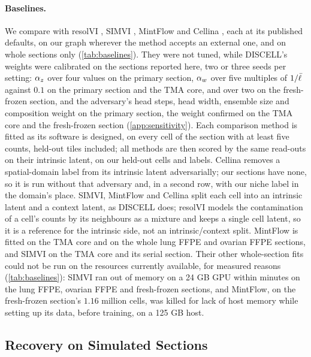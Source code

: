 \paragraph{Baselines.}
We compare with resolVI \citep{ergen2025}, SIMVI \citep{dong2025simvi}, MintFlow \citep{akbarnejad2025mintflow} and Cellina \citep{moeed2026cellina}, each at its published defaults, on our graph wherever the method accepts an external one, and on whole sections only (\cref{tab:baselines}). They were not tuned, while DISCELL's weights were calibrated on the sections reported here, two or three seeds per setting: $\alpha_z$ over four values on the primary section, $\alpha_w$ over five multiples of $1/\bar{\ell}$ against $0.1$ on the primary section and the TMA core, and over two on the fresh-frozen section, and the adversary's head steps, head width, ensemble size and composition weight on the primary section, the weight confirmed on the TMA core and the fresh-frozen section (\cref{app:sensitivity}). Each comparison method is fitted as its software is designed, on every cell of the section with at least five counts, held-out tiles included; all methods are then scored by the same read-outs on their intrinsic latent, on our held-out cells and labels. Cellina removes a spatial-domain label from its intrinsic latent adversarially; our sections have none, so it is run without that adversary and, in a second row, with our niche label in the domain's place. SIMVI, MintFlow and Cellina split each cell into an intrinsic latent and a context latent, as DISCELL does; resolVI models the contamination of a cell's counts by its neighbours as a mixture and keeps a single cell latent, so it is a reference for the intrinsic side, not an intrinsic/context split. MintFlow is fitted on the TMA core and on the whole lung FFPE and ovarian FFPE sections, and SIMVI on the TMA core and its serial section. Their other whole-section fits could not be run on the resources currently available, for measured reasons (\cref{tab:baselines}): SIMVI ran out of memory on a 24 GB GPU within minutes on the lung FFPE, ovarian FFPE and fresh-frozen sections, and MintFlow, on the fresh-frozen section's $1.16$ million cells, was killed for lack of host memory while setting up its data, before training, on a 125 GB host.

\subsection{Recovery on Simulated Sections}
\label{sec:synthetic}

